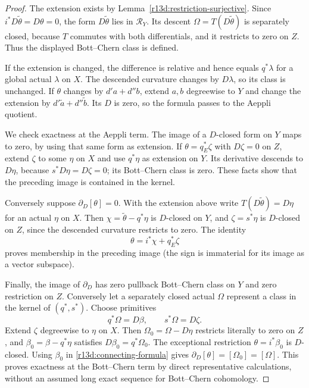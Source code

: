 \begin{proof}
The extension exists by Lemma~\ref{r13d:restriction-surjective}.
Since $i^*D\widetilde\theta=D\theta=0$, the form
$D\widetilde\theta$ lies in $\mathcal R_Y$.  Its descent
$\Omega=T(D\widetilde\theta)$ is separately closed, because $T$
commutes with both differentials, and it restricts to zero on $Z$.
Thus the displayed Bott--Chern class is defined.

If the extension is changed, the difference is relative and hence
equals $q^*\lambda$ for a global actual $\lambda$ on $X$.
The descended curvature changes by $D\lambda$, so its class is
unchanged.  If $\theta$ changes by $d'a+d''b$, extend $a,b$
degreewise to $Y$ and change the extension by
$d'\widetilde a+d''\widetilde b$.  Its $D$ is zero, so the formula
passes to the Aeppli quotient.

We check exactness at the Aeppli term.  The image of a $D$-closed
form on $Y$ maps to zero, by using that same form as extension.
If $\theta=q_E^*\zeta$ with $D\zeta=0$ on $Z$, extend $\zeta$
to some $\eta$ on $X$ and use $q^*\eta$ as extension on $Y$.
Its derivative descends to $D\eta$, because
$s^*D\eta=D\zeta=0$; its Bott--Chern class is zero.  These facts
show that the preceding image is contained in the kernel.

Conversely suppose $\partial_D[\theta]=0$.  With the extension
above write $T(D\widetilde\theta)=D\eta$ for an actual $\eta$
on $X$.  Then
$\chi=\widetilde\theta-q^*\eta$ is $D$-closed on $Y$, and
$\zeta=s^*\eta$ is $D$-closed on $Z$, since the descended curvature
restricts to zero.  The identity
\[
                            \theta=i^*\chi+q_E^*\zeta
\]
proves membership in the preceding image (the sign is immaterial
for its image as a vector subspace).

Finally, the image of $\partial_D$ has zero pullback Bott--Chern
class on $Y$ and zero restriction on $Z$.  Conversely let a
separately closed actual $\Omega$ represent a class in the kernel
of $(q^*,s^*)$.  Choose primitives
\[
                        q^*\Omega=D\beta,\qquad
                        s^*\Omega=D\zeta.
\]
Extend $\zeta$ degreewise to $\eta$ on $X$.  Then
$\Omega_0=\Omega-D\eta$ restricts literally to zero on $Z$, and
$\beta_0=\beta-q^*\eta$ satisfies $D\beta_0=q^*\Omega_0$.
The exceptional restriction $\theta=i^*\beta_0$ is $D$-closed.
Using $\beta_0$ in \eqref{r13d:connecting-formula} gives
$\partial_D[\theta]=[\Omega_0]=[\Omega]$.
This proves exactness at the Bott--Chern term by direct
representative calculations, without an assumed long exact
sequence for Bott--Chern cohomology.
\end{proof}


